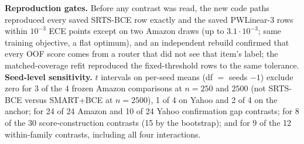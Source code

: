 \documentclass[sigconf,anonymous,review]{acmart}
\begin{document}
\textbf{Reproduction gates.} Before any contrast was read, the new code
paths reproduced every saved SRTS-BCE row exactly and the saved
PWLinear-3 rows within $10^{-3}$ ECE points except on two Amazon draws (up
to $3.1\cdot10^{-3}$; same training objective, a flat optimum), and an
independent rebuild confirmed that every OOF score comes from a router
that did not see that item's label; the matched-coverage refit
reproduced the fixed-threshold rows to the same tolerance.
\textbf{Seed-level sensitivity.} $t$ intervals on per-seed means
(df $=$ seeds $-1$) exclude zero for 3 of the 4 frozen Amazon comparisons
at $n{=}250$ and $2500$ (not SRTS-BCE versus SMART+BCE at $n{=}2500$), 1 of
4 on Yahoo and 2 of 4 on the anchor; for 24 of 24 Amazon and 10 of 24 Yahoo
confirmation gap contrasts; for 8 of the 30 score-construction contrasts
(15 by the bootstrap); and for 9 of the 12 within-family contrasts,
including all four interactions.
\end{document}
